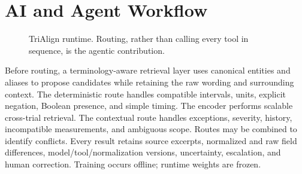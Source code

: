 \documentclass[10pt]{article}
\begin{document}
\section{AI and Agent Workflow}
\begin{figure}[ht]\centering
{}\caption{TriAlign runtime. Routing, rather than calling every tool in sequence, is the agentic contribution.}
\end{figure}

Before routing, a terminology-aware retrieval layer uses canonical entities and aliases to propose candidates while retaining the raw wording and surrounding context. The deterministic route handles compatible intervals, units, explicit negation, Boolean presence, and simple timing. The encoder performs scalable cross-trial retrieval. The contextual route handles exceptions, severity, history, incompatible measurements, and ambiguous scope. Routes may be combined to identify conflicts. Every result retains source excerpts, normalized and raw field differences, model/tool/normalization versions, uncertainty, escalation, and human correction. Training occurs offline; runtime weights are frozen.
\end{document}
